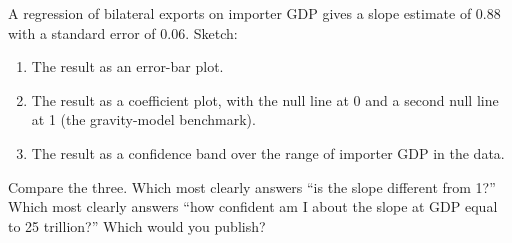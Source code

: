 \documentclass[
  letterpaper,
  11pt,
  twoside,
  openany]{scrbook}
\providecommand{\tightlist}{%
  \setlength{\itemsep}{0pt}\setlength{\parskip}{0pt}}
\begin{document}
\begin{tcolorbox}[enhanced jigsaw, arc=.35mm, bottomrule=.15mm, bottomtitle=1mm, breakable, colback=white, colbacktitle=quarto-callout-tip-color!10!white, colframe=quarto-callout-tip-color-frame, coltitle=black, left=2mm, leftrule=.75mm, opacityback=0, opacitybacktitle=0.6, rightrule=.15mm, title=\textcolor{quarto-callout-tip-color}{\faLightbulb}\hspace{0.5em}{Try this}, titlerule=0mm, toprule=.15mm, toptitle=1mm]

A regression of bilateral exports on importer GDP gives a slope estimate
of 0.88 with a standard error of 0.06. Sketch:

\begin{enumerate}
\def\labelenumi{\arabic{enumi}.}
\tightlist
\item
  The result as an error-bar plot.
\item
  The result as a coefficient plot, with the null line at 0 and a second
  null line at 1 (the gravity-model benchmark).
\item
  The result as a confidence band over the range of importer GDP in the
  data.
\end{enumerate}

Compare the three. Which most clearly answers ``is the slope different
from 1?'' Which most clearly answers ``how confident am I about the
slope at GDP equal to 25 trillion?'' Which would you publish?

\end{tcolorbox}
\end{document}

